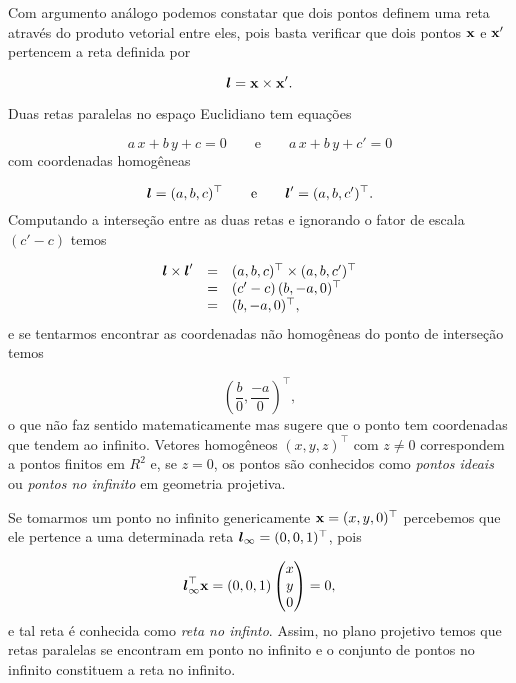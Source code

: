 Com argumento análogo podemos constatar que dois pontos definem uma reta através do produto vetorial entre eles, pois basta verificar que dois pontos $\mathbf{x}$ e $\mathbf{x}'$ pertencem a reta definida por

\begin{equation*}
\boldsymbol{l}=\mathbf{x}\times\mathbf{x}'.
\end{equation*}



Duas retas paralelas no espaço Euclidiano tem equações

\begin{equation*}
a\,x+b\,y+c=0\qquad\text{e}\qquad a\,x+b\,y+c'=0
\end{equation*}
com coordenadas homogêneas

\begin{equation*}
\boldsymbol{l}=(a,b,c)^\top\qquad\text{e}\qquad\boldsymbol{l}'=(a,b,c')^\top.
\end{equation*}
Computando a interseção entre as duas retas e ignorando o fator de escala $(c'-c)$ temos

\begin{equation*}
\begin{array}{rcl}
\boldsymbol{l}\times\boldsymbol{l}'&=&(a,b,c)^\top\times(a,b,c')^\top\\
&=&(c'-c)\,(b,-a,0)^\top\\
&=&(b,-a,0)^\top,
\end{array}
\end{equation*}
e se tentarmos encontrar as coordenadas não homogêneas do ponto de interseção temos

\begin{equation*}
\left(\frac{b}{0},\frac{-a}{0}\right)^\top,
\end{equation*}
o que não faz sentido matematicamente mas sugere que o ponto tem coordenadas que tendem ao infinito. Vetores homogêneos $(x,y,z)^\top$ com $z\neq0$ correspondem a pontos finitos em $R^2$ e, se $z=0$, os pontos são conhecidos como \textit{pontos ideais} ou \textit{pontos no infinito} em geometria projetiva.

Se tomarmos um ponto no infinito genericamente $\mathbf{x}=(x,y,0)^\top$ percebemos que ele pertence a uma determinada reta $\boldsymbol{l}_\infty=(0,0,1)^\top$, pois

\begin{equation*}
\boldsymbol{l}_\infty^\top \mathbf{x}=(0,0,1)
\begin{pmatrix}
x\\
y\\
0
\end{pmatrix}
=0,
\end{equation*} 
e tal reta é conhecida como \textit{reta no infinto}. Assim, no plano projetivo temos que retas paralelas se encontram em ponto no infinito e o conjunto de pontos no infinito constituem a reta no infinito.\\






